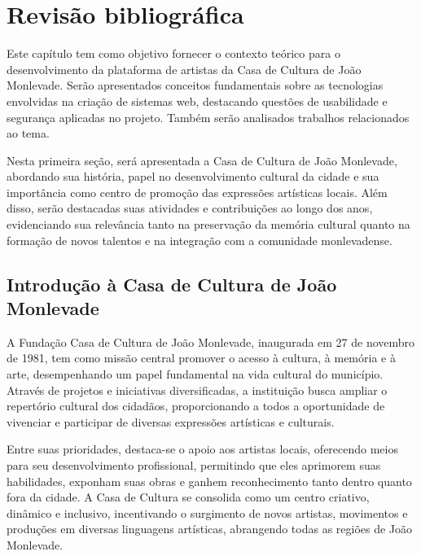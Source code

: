 \chapter{Revisão bibliográfica}
\label{cap:revisao}
Este capítulo tem como objetivo fornecer o contexto teórico para o desenvolvimento da plataforma de artistas da Casa de Cultura de João Monlevade. Serão apresentados conceitos fundamentais sobre as tecnologias envolvidas na criação de sistemas web, destacando questões de usabilidade e segurança aplicadas no projeto. Também serão analisados trabalhos relacionados ao tema.

Nesta primeira seção, será apresentada a Casa de Cultura de João Monlevade, abordando sua história, papel no desenvolvimento cultural da cidade e sua importância como centro de promoção das expressões artísticas locais. Além disso, serão destacadas suas atividades e contribuições ao longo dos anos, evidenciando sua relevância tanto na preservação da memória cultural quanto na formação de novos talentos e na integração com a comunidade monlevadense.


\section{Introdução à Casa de Cultura de João Monlevade}

A Fundação Casa de Cultura de João Monlevade, inaugurada em 27 de novembro de 1981, tem como missão central promover o acesso à cultura, à memória e à arte, desempenhando um papel fundamental na vida cultural do município. Através de projetos e iniciativas diversificadas, a instituição busca ampliar o repertório cultural dos cidadãos, proporcionando a todos a oportunidade de vivenciar e participar de diversas expressões artísticas e culturais.

Entre suas prioridades, destaca-se o apoio aos artistas locais, oferecendo meios para seu desenvolvimento profissional, permitindo que eles aprimorem suas habilidades, exponham suas obras e ganhem reconhecimento tanto dentro quanto fora da cidade. A Casa de Cultura se consolida como um centro criativo, dinâmico e inclusivo, incentivando o surgimento de novos artistas, movimentos e produções em diversas linguagens artísticas, abrangendo todas as regiões de João Monlevade.

